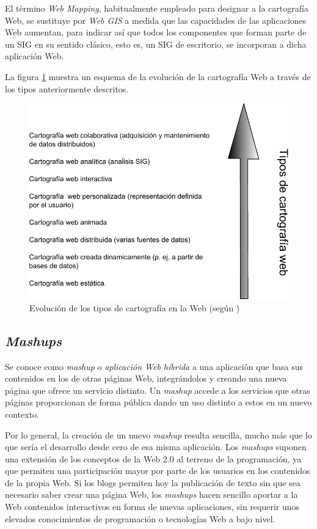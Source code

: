 El término \emph{Web Mapping}, habitualmente empleado para designar a la cartografía Web, se sustituye por \emph{Web GIS} a medida que las capacidades de las aplicaciones Web aumentan, para indicar así que todos los componentes que forman parte de un SIG en su sentido clásico, esto es, un SIG de escritorio, se incorporan a dicha aplicación Web.

La figura \ref{Fig:Tipos_Cartografia_Web} muestra un esquema de la evolución de la cartografía Web a través de los tipos anteriormente descritos.

\begin{figure}[!hbt]   
\centering
\includegraphics[width=.6\mycolumnwidth]{Cliente_servidor/tipos_cartografia_web.pdf}
\caption{\small Evolución de los tipos de cartografía en la Web (según \cite{Kraak2001Francis})}
\label{Fig:Tipos_Cartografia_Web} 
\end{figure}

\subsection{ \emph{Mashups}}

Se conoce como \emph{mashup} o \emph{aplicación Web híbrida} a una aplicación que basa sus contenidos en los de otras páginas Web, integrándolos y creando una nueva página que ofrece un servicio distinto. Un \emph{mashup} accede a los servicios que otras páginas proporcionan de forma pública dando un uso distinto a estos en un nuevo contexto.

Por lo general, la creación de un nuevo \emph{mashup} resulta sencilla, mucho más que lo que sería el desarrollo desde cero de esa misma aplicación. Los \emph{mashups} suponen una extensión de los conceptos de la Web 2.0 al terreno de la programación, ya que permiten una participación mayor por parte de los usuarios en los contenidos de la propia Web. Si los blogs permiten hoy la publicación de texto sin que sea necesario saber crear una página Web, los \emph{mashups} hacen sencillo aportar a la Web contenidos interactivos en forma de nuevas aplicaciones, sin requerir unos elevados conocimientos de programación o tecnologías Web a bajo nivel. 

